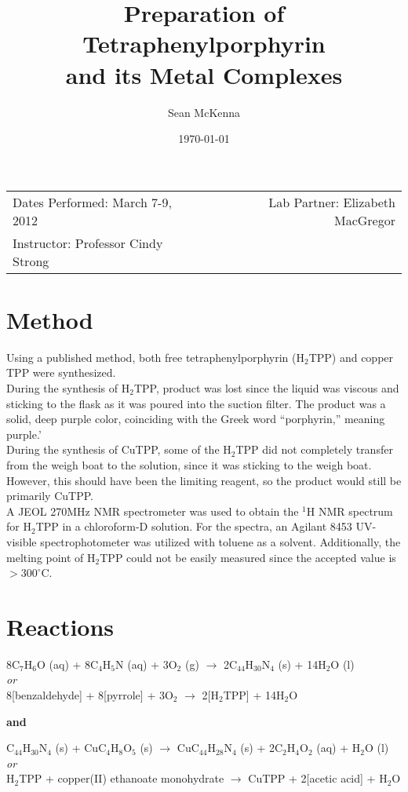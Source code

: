 \documentclass[11pt]{article}
\title{Preparation of Tetraphenylporphyrin \\ and its Metal Complexes}
\author{Sean McKenna}
\date{\today}
\newcommand{\super}[1]{\ensuremath{^{\textrm{#1}}}}
\newcommand{\sub}[1]{\ensuremath{_{\textrm{#1}}}}
\begin{document}
\maketitle

\begin{center}
\begin{tabular}{lr}
Dates Performed: March 7-9, 2012 & Lab Partner: Elizabeth MacGregor\\
Instructor: Professor Cindy Strong
\end{tabular}
\end{center}


\section{Method}
Using a published method,\cite{lab} both free tetraphenylporphyrin (H\sub{2}TPP) and copper TPP were synthesized. \\

During the synthesis of H\sub{2}TPP, product was lost since the liquid was viscous and sticking to the flask as it was poured into the suction filter. The product was a solid, deep purple color, coinciding with the Greek word ``porphyrin,'' meaning purple.' \\

During the synthesis of CuTPP, some of the H\sub{2}TPP did not completely transfer from the weigh boat to the solution, since it was sticking to the weigh boat. However, this should have been the limiting reagent, so the product would still be primarily CuTPP. \\

A JEOL 270MHz NMR spectrometer was used to obtain the \super{1}H NMR spectrum for H\sub{2}TPP in a chloroform-D solution. For the spectra, an Agilant 8453 UV-visible spectrophotometer was utilized with toluene as a solvent. Additionally, the melting point of H\sub{2}TPP could not be easily measured since the accepted value is $>300^{\circ}$C. \cite{tpp}


\section{Reactions}
\begin{center}
8C\sub{7}H\sub{6}O (aq) + 8C\sub{4}H\sub{5}N (aq) + 3O\sub{2} (g) $\rightarrow$ 2C\sub{44}H\sub{30}N\sub{4} (s) + 14H\sub{2}O (l) \\
\textit{or} \\
8[benzaldehyde] + 8[pyrrole] + 3O\sub{2} $\rightarrow$ 2[H\sub{2}TPP] + 14H\sub{2}O \bigskip

\textbf{and} \bigskip

C\sub{44}H\sub{30}N\sub{4} (s) + CuC\sub{4}H\sub{8}O\sub{5} (s) $\rightarrow$ CuC\sub{44}H\sub{28}N\sub{4} (s) + 2C\sub{2}H\sub{4}O\sub{2} (aq) + H\sub{2}O (l) \\
\textit{or} \\
H\sub{2}TPP + copper(II) ethanoate monohydrate $\rightarrow$ CuTPP + 2[acetic acid] + H\sub{2}O
\end{center}
\end{document}
